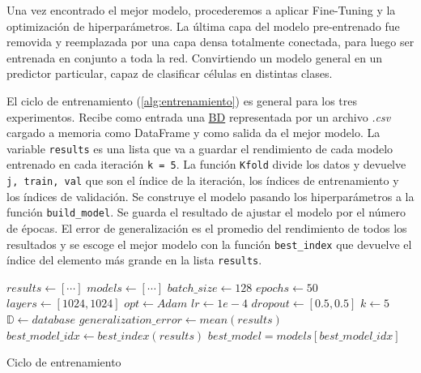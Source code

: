 Una vez encontrado el mejor modelo, procederemos a aplicar Fine-Tuning y la
optimización de hiperparámetros. La última capa del modelo pre-entrenado fue
removida y reemplazada por una capa densa totalmente conectada, para luego ser
entrenada en conjunto a toda la red. Convirtiendo un modelo general en un
predictor particular, capaz de clasificar células en distintas clases.

El ciclo de entrenamiento (\autoref{alg:entrenamiento}) es general para los tres
experimentos. Recibe como entrada una \hyperlink{abbr}{BD} representada por un
archivo \emph{.csv} cargado a memoria como DataFrame y como salida da el mejor
modelo. La variable \texttt{results} es una lista que va a guardar el
rendimiento de cada modelo entrenado en cada iteración \texttt{k =
5}. La función \texttt{Kfold} divide los datos y devuelve
\texttt{j, train, val} que son el índice de la iteración, los índices
de entrenamiento y los índices de validación. Se construye el modelo pasando los
hiperparámetros a la función \texttt{build_model}. Se guarda el
resultado de ajustar el modelo por el número de épocas. El error de
generalización es el promedio del rendimiento de todos los resultados y se
escoge el mejor modelo con la función \texttt{best_index} que
devuelve el índice del elemento más grande en la lista
\texttt{results}.

\begin{algorithm}
    \SetAlgoLined{}
    \(results \longleftarrow [ \cdots ]\)
    \BlankLine{}
    \(models \longleftarrow [ \cdots ]\)
    \BlankLine{}
    \(batch\_size \longleftarrow 128\)
    \BlankLine{}
    \(epochs \longleftarrow 50\)
    \BlankLine{}
    \(layers \longleftarrow [1024, 1024]\)
    \BlankLine{}
    \(opt \longleftarrow Adam\)
    \BlankLine{}
    \(lr \longleftarrow 1e-4\)
    \BlankLine{}
    \(dropout \longleftarrow [0.5, 0.5]\)
    \BlankLine{}
    \(k \longleftarrow 5\)
    \BlankLine{}
    \(\mathbb{D}  \longleftarrow database\)
    \BlankLine{}
    \BlankLine{}
    \(generalization\_error \longleftarrow mean(results)\)
    \BlankLine{}
    \(best\_model\_idx \longleftarrow best\_index(results)\)
    \BlankLine{}
    \(best\_model = models[best\_model\_idx]\)
    \caption{Ciclo de entrenamiento}\label{alg:entrenamiento}
\end{algorithm}

